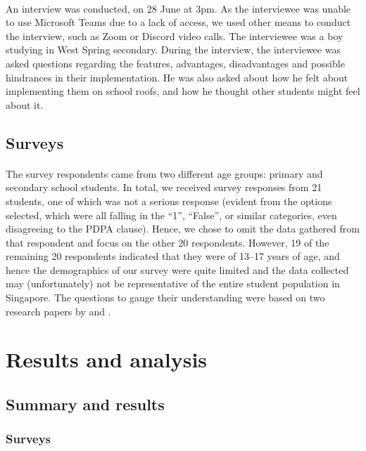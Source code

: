 \documentclass[a4paper]{article}
\begin{document}
\begin{multicols}{2}
  \paragraph{} An interview was conducted, on 28 June at 3pm. As
  the interviewee was unable to use Microsoft Teams due to a lack
  of access, we used other means to conduct the interview, such as
  Zoom or Discord video calls. The interviewee was a boy studying in
  West Spring secondary. During the interview, the interviewee was
  asked questions regarding the features, advantages, disadvantages and
  possible hindrances in their implementation. He was also asked about
  how he felt about implementing them on school roofs, and how he thought
  other students might feel about it.

  \subsection{Surveys}
  \paragraph{} The survey respondents came from two different age groups:
  primary and secondary school students. In total, we received survey
  responses from 21 students, one of which was not a serious response
  (evident from the options selected, which were all falling in the
  ``1'', ``False'', or similar categories, even disagreeing to the
  PDPA clause). Hence, we chose to omit the data gathered from that
  respondent and focus on the other 20 respondents. However, 19 of the
  remaining 20 respondents indicated that they were of 13--17 years of
  age, and hence the demographics of our survey were quite limited and
  the data collected may (unfortunately) not be representative of the
  entire student population in Singapore. The questions to gauge their
  understanding were based on two research papers by \cite{HKGreenRoofGL}
  and \cite{energeff}.



  \section{Results and analysis}
  \subsection{Summary and results}
  \subsubsection{Surveys}


\end{multicols}
\end{document}
